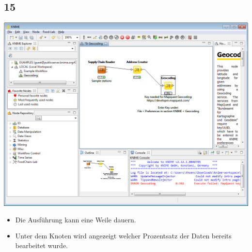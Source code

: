 \documentclass{beamer}
\begin{document}
\subsection{15}
\begin{frame}
	\begin{center}
  		\includegraphics[height=0.6\textheight]{15.png}
	\end{center}
	\begin{itemize}
		\item Die Ausführung kann eine Weile dauern.
		\item Unter dem Knoten wird angezeigt welcher Prozentsatz der Daten bereits bearbeitet wurde.
	\end{itemize}
\end{frame}
\end{document}
